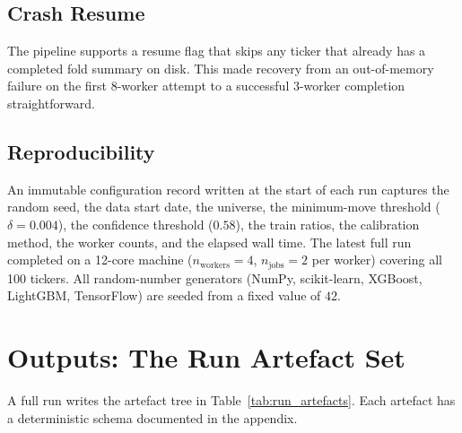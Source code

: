 \subsection{Crash Resume}

The pipeline supports a resume flag that skips any ticker that already has a completed fold summary on disk. This made recovery from an out-of-memory failure on the first 8-worker attempt to a successful 3-worker completion straightforward.

\subsection{Reproducibility}

An immutable configuration record written at the start of each run captures the random seed, the data start date, the universe, the minimum-move threshold ($\delta=0.004$), the confidence threshold ($0.58$), the train ratios, the calibration method, the worker counts, and the elapsed wall time. The latest full run completed on a 12-core machine ($n_\mathrm{workers}=4$, $n_\mathrm{jobs}=2$ per worker) covering all 100 tickers. All random-number generators (NumPy, scikit-learn, XGBoost, LightGBM, TensorFlow) are seeded from a fixed value of $42$.

\section{Outputs: The Run Artefact Set}

A full run writes the artefact tree in Table~\ref{tab:run_artefacts}. Each artefact has a deterministic schema documented in the appendix.

